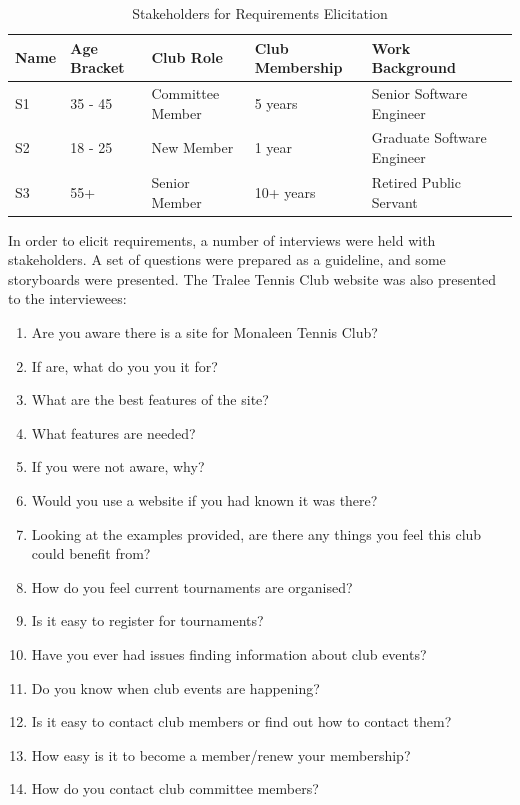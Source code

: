 \begin{table}[H]
\caption{Stakeholders for Requirements Elicitation}
\begin{center}
    \begin{tabular}{ | l | l | l | l | l| p{5cm} |}
    \hline
    Name & Age Bracket & Club Role & Club Membership & Work Background \\ \hline
	S1 & 35 - 45& Committee Member & 5 years & Senior Software Engineer \\ \hline
	S2 & 18 - 25 & New Member & 1 year & Graduate Software Engineer \\ \hline
	S3 & 55+ & Senior Member & 10+ years & Retired Public Servant \\ \hline
    \end{tabular}
\end{center}
\label{fig:userelicit}
\end{table}

In order to elicit requirements, a number of interviews were held with stakeholders. A set of questions were prepared as a guideline, and some storyboards were presented. The Tralee Tennis Club website was also presented to the interviewees:

\begin{enumerate}
\item Are you aware there is a site for Monaleen Tennis Club?
\item If are, what do you you it for?
\item What are the best features of the site? 
\item What features are needed?
\item If you were not aware, why? 
\item Would you use a website if you had known it was there?
\item Looking at the examples provided, are there any things you feel this club could benefit from?
\item How do you feel current tournaments are organised?
\item Is it easy to register for tournaments?
\item Have you ever had issues finding information about club events?
\item Do you know when club events are happening?
\item Is it easy to contact club members or find out how to contact them?
\item How easy is it to become a member/renew your membership?
\item How do you contact club committee members?  
\end{enumerate}


